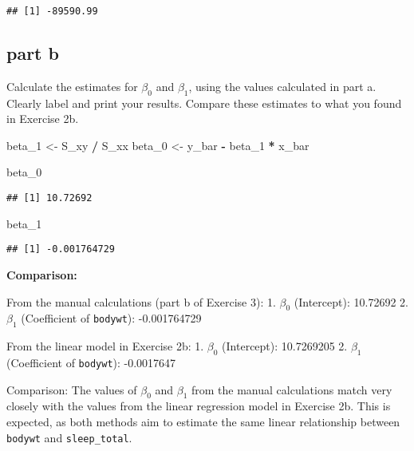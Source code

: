 \documentclass[
]{article}
\newenvironment{Shaded}{\begin{snugshade}}{\end{snugshade}}
\newcommand{\NormalTok}[1]{#1}
\newcommand{\OtherTok}[1]{\textcolor[rgb]{0.56,0.35,0.01}{#1}}
\newcommand{\SpecialCharTok}[1]{\textcolor[rgb]{0.81,0.36,0.00}{\textbf{#1}}}
\begin{document}
\begin{verbatim}
## [1] -89590.99
\end{verbatim}

\subsection{part b}\label{part-b-1}

Calculate the estimates for \(\beta_0\) and \(\beta_1\), using the
values calculated in part a. Clearly label and print your results.
Compare these estimates to what you found in Exercise 2b.

\begin{Shaded}
\begin{Highlighting}[]
\NormalTok{beta\_1 }\OtherTok{\textless{}{-}}\NormalTok{ S\_xy }\SpecialCharTok{/}\NormalTok{ S\_xx}
\NormalTok{beta\_0 }\OtherTok{\textless{}{-}}\NormalTok{ y\_bar }\SpecialCharTok{{-}}\NormalTok{ beta\_1 }\SpecialCharTok{*}\NormalTok{ x\_bar}

\NormalTok{beta\_0}
\end{Highlighting}
\end{Shaded}

\begin{verbatim}
## [1] 10.72692
\end{verbatim}

\begin{Shaded}
\begin{Highlighting}[]
\NormalTok{beta\_1}
\end{Highlighting}
\end{Shaded}

\begin{verbatim}
## [1] -0.001764729
\end{verbatim}

\textbf{Comparison:}

From the manual calculations (part b of Exercise 3): 1. \(\beta_0\)
(Intercept): 10.72692 2. \(\beta_1\) (Coefficient of \texttt{bodywt}):
-0.001764729

From the linear model in Exercise 2b: 1. \(\beta_0\) (Intercept):
10.7269205 2. \(\beta_1\) (Coefficient of \texttt{bodywt}): -0.0017647

Comparison: The values of \(\beta_0\) and \(\beta_1\) from the manual
calculations match very closely with the values from the linear
regression model in Exercise 2b. This is expected, as both methods aim
to estimate the same linear relationship between \texttt{bodywt} and
\texttt{sleep\_total}.
\end{document}
